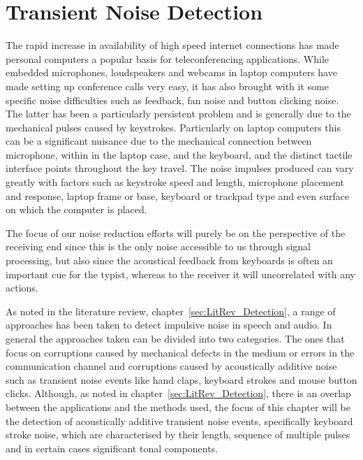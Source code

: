 \chapter{Transient Noise Detection}\label{ch:TransientNoiseDetection}

\ifpdf
    \graphicspath{{Chapter5_TransNoiseDet/Chapter5Figs/PNG/}{Chapter5_TransNoiseDet/Chapter5Figs/PDF/}{Chapter5_TransNoiseDet/Chapter5Figs/}{Chapter5_TransNoiseDet/Chapter5Figs/NoiseBurstModel/}{Chapter5_TransNoiseDet/Chapter5Figs/ARFilterMethod/}}
\else
    \graphicspath{{Chapter5_TransNoiseDet/Chapter5Figs/EPS/}{Chapter5_TransNoiseDet/Chapter5Figs/}}
\fi

The rapid increase in availability of high speed internet connections has made personal computers a popular basis for teleconferencing applications. While embedded microphones, loudspeakers and webcams in laptop computers have made setting up conference calls very easy, it has also brought with it some specific noise difficulties such as feedback, fan noise and button clicking noise. The latter has been a particularly persistent problem and is generally due to the mechanical pulses caused by keystrokes. Particularly on laptop computers this can be a significant nuisance due to the mechanical connection between microphone, within in the laptop case, and the keyboard, and the distinct tactile interface points throughout the key travel. The noise impulses produced can vary greatly with factors such as keystroke speed and length, microphone placement and response, laptop frame or base, keyboard or trackpad type and even surface on which the computer is placed.

The focus of our noise reduction efforts will purely be on the perspective of the receiving end since this is the only noise accessible to us through signal processing, but also since the acoustical feedback from keyboards is often an important cue for the typist, whereas to the receiver it will uncorrelated with any actions.

As noted in the literature review, chapter~\ref{sec:LitRev_Detection}, a range of approaches has been taken to detect impulsive noise in speech and audio. In general the approaches taken can be divided into two categories. The ones that focus on corruptions caused by mechanical defects in the medium or errors in the communication channel and corruptions caused by acoustically additive noise such as transient noise events like hand claps, keyboard strokes and mouse button clicks. Although, as noted in chapter~\ref{sec:LitRev_Detection}, there is an overlap between the applications and the methods used, the focus of this chapter will be the detection of acoustically additive transient noise events, specifically keyboard stroke noise, which are characterised by their length, sequence of multiple pulses and in certain cases significant tonal components.

